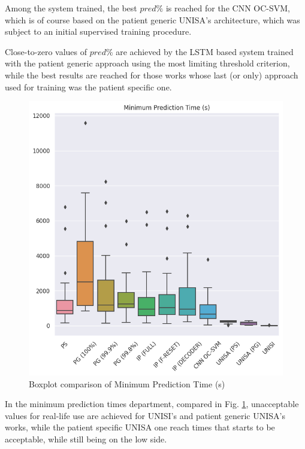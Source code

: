 Among the system trained, the best $pred\%$ is reached for the \gls{CNN} \gls{OC-SVM}, which is of course based on the patient generic \gls{UNISA}'s architecture, which was subject to an initial supervised training procedure.

Close-to-zero values of $pred\%$ are achieved by the \gls{LSTM} based system trained with the patient generic approach using the most limiting threshold criterion, while the best results are reached for those works whose last (or only) approach used for training was the patient specific one.

\begin{figure}[ht]
    \centering
    \includegraphics[width=1.0\textwidth]{images/Experimental-validation/boxplot_mPT.png}
    \caption{Boxplot comparison of Minimum Prediction Time (s)}
    \label{fig:boxplot_mPT}
\end{figure}

In the minimum prediction times department, compared in Fig. \ref{fig:boxplot_mPT}, unacceptable values for real-life use are achieved for \gls{UNISI}'s and patient generic \gls{UNISA}'s works, while the patient specific \gls{UNISA} one reach times that starts to be acceptable, while still being on the low side.

